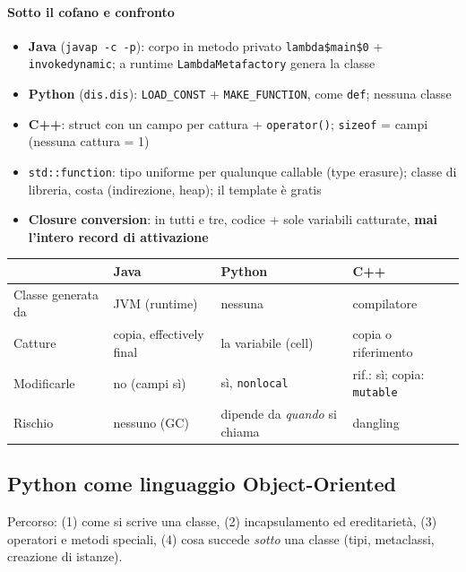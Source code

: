\documentclass[12pt]{extarticle}
\begin{document}
\paragraph{Sotto il cofano e confronto}
\begin{itemize}
    \item \textbf{Java} (\texttt{javap -c -p}): corpo in metodo privato \texttt{lambda\$main\$0} + \texttt{invokedynamic}; a runtime \texttt{LambdaMetafactory} genera la classe
    \item \textbf{Python} (\texttt{dis.dis}): \texttt{LOAD\_CONST} + \texttt{MAKE\_FUNCTION}, come \texttt{def}; nessuna classe
    \item \textbf{C++}: struct con un campo per cattura + \texttt{operator()}; \texttt{sizeof} = campi (nessuna cattura = 1)
    \item \texttt{std::function}: tipo uniforme per qualunque callable (type erasure); classe di libreria, costa (indirezione, heap); il template è gratis
    \item \textbf{Closure conversion}: in tutti e tre, codice + sole variabili catturate, \textbf{mai l'intero record di attivazione}
\end{itemize}

\begin{center}
\small
\begin{tabular}{p{3.0cm}p{4.2cm}p{4.2cm}p{3.4cm}}
    \toprule
    & \textbf{Java} & \textbf{Python} & \textbf{C++} \\
    \midrule
    Classe generata da & JVM (runtime) & nessuna & compilatore \\
    \addlinespace
    Catture & copia, effectively final & la variabile (cell) & copia o riferimento \\
    \addlinespace
    Modificarle & no (campi sì) & sì, \texttt{nonlocal} & rif.: sì; copia: \texttt{mutable} \\
    \addlinespace
    Rischio & nessuno (GC) & dipende da \emph{quando} si chiama & dangling \\
    \bottomrule
\end{tabular}
\end{center}

\subsection{Python come linguaggio Object-Oriented}
Percorso: (1) come si scrive una classe, (2) incapsulamento ed ereditarietà, (3) operatori e metodi speciali, (4) cosa succede \emph{sotto} una classe (tipi, metaclassi, creazione di istanze).
\end{document}
